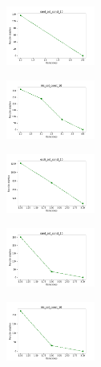 \begin{figure}[H]
\begin{subfigure}
    \end{subfigure}
    \hfill
    \begin{subfigure}
        \centering
        \includegraphics[width=0.32\textwidth]{img/copkm2/rand_set_const_10_589741062_cost.png}
    \end{subfigure}
    \hfill
    \begin{subfigure}
        \centering
        \includegraphics[width=0.32\textwidth]{img/copkm2/iris_set_const_10_277451237_cost.png}
    \end{subfigure}
    \hfill
    \begin{subfigure}
        \centering
        \includegraphics[width=0.32\textwidth]{img/copkm2/ecoli_set_const_10_277451237_cost.png}
    \end{subfigure}
    \hfill
    \begin{subfigure}
        \centering
        \includegraphics[width=0.32\textwidth]{img/copkm2/rand_set_const_10_277451237_cost.png}
    \end{subfigure}
    \hfill
    \begin{subfigure}
        \centering
        \includegraphics[width=0.32\textwidth]{img/copkm2/iris_set_const_10_49258669_cost.png}

\end{subfigure}
\end{figure}
